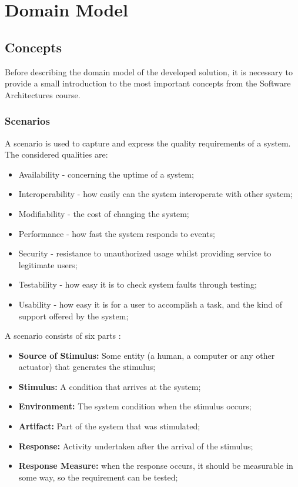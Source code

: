 \chapter{Domain Model}
\label{chapter:domainModel}

\section{Concepts}
\label{section:SAConcepts}
Before describing the domain model of the developed solution, it is necessary to provide a small introduction to the most important concepts from the Software Architectures course.
\subsection{Scenarios}
\label{subsection:SAConceptsScenarios}
A scenario is used to capture and express the quality requirements of a system. The considered qualities are:
\begin{itemize}
\item Availability - concerning the uptime of a system;
\item Interoperability - how easily can the system interoperate with other system;
\item Modifiability - the cost of changing the system;
\item Performance - how fast the system responds to events;
\item Security - resistance to unauthorized usage whilst providing service to legitimate users;
\item Testability - how easy it is to check system faults through testing;
\item Usability - how easy it is for a user to accomplish a task, and the kind of support offered by the system;
\end{itemize}

A scenario consists of six parts \cite{bass2003software}:
\begin{itemize}
\item \textbf{Source of Stimulus:} Some entity (a human, a computer or any other actuator) that generates the stimulus;
\item \textbf{Stimulus:} A condition that arrives at the system;
\item \textbf{Environment:} The system condition when the stimulus occurs;
\item \textbf{Artifact:} Part of the system that was stimulated;
\item \textbf{Response:} Activity undertaken after the arrival of the stimulus;
\item \textbf{Response Measure:} when the response occurs, it should be measurable in some way, so the requirement can be tested;
\end{itemize}

